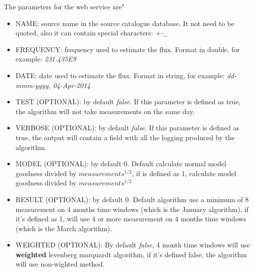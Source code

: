 \documentclass[10pt]{article}
\begin{document}
\noindent The parameters for the web service are"
\begin{itemize}
 \item NAME: source name in the source catalogue database. It not need to be quoted, also it can contain special characters: \emph{+-\_}
 \item FREQUENCY: frequency used to estimate the flux. Format in double, for example: \emph{231.435E9}
 \item DATE: date used to estimate the flux. Format in string, for example: \emph{dd-mmm-yyyy, 04-Apr-2014}
 \item TEST (OPTIONAL): by default \emph{false}. If this parameter is defined as true, the algorithm will not take measurements on the same day.
 \item VERBOSE (OPTIONAL): by default \emph{false}. If this parameter is defined as true, the output will contain a field with all the logging produced by the algorithm.
 \item MODEL (OPTIONAL): by default 0. Default calculate normal model goodness divided by $measurements^{1/2}$, if is defined as 1, calculate model goodness divided by $measurements^{1/2}$
 \item RESULT (OPTIONAL): by default 0. Default algorithm use a minimum of 8 measurement on 4 months time windows (which is the January algorithm), if it's defined as 1, will use 4 or more measurement on 4 months time windows (which is the March algorithm).
 \item WEIGHTED (OPTIONAL): By default \emph{false}, 4 month time windows will use \textbf{weighted} levenberg marquardt algorithm, if it's defined false, the algorithm will use non-wighted method.
\end{itemize}
\end{document}
